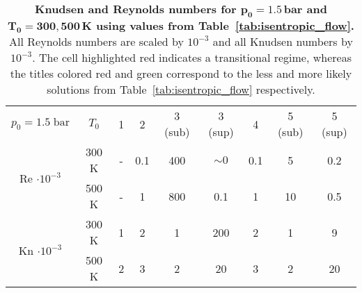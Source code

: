 \begin{table}[H]
    \centering
    \renewcommand{\arraystretch}{1.2}
    \begin{tabular}{|c|c|c|c|c|c|c|c|c|}
    \hline
    \multirow{2}{*}{\small $p_0 = 1.5\;\text{bar}$} 
        & \multirow{2}{*}{$T_0$} 
        & \multirow{2}{*}{1} 
        & \multirow{2}{*}{2} 
        & \multirow{2}{*}{\color{greenColor} 3 (sub)} 
        & \multirow{2}{*}{\color{redColor} 3 (sup)} 
        & \multirow{2}{*}{4} 
        & \multirow{2}{*}{\color{redColor} 5 (sub)} 
        & \multirow{2}{*}{\color{greenColor} 5 (sup)} \\
    & & & & & & & & \\ \hline

    \multirow{2}{*}{Re $\cdot10^{-3}$} 
      & 300 K 
          & - 
          & 0.1 
          & 400 
          & $\sim 0$ 
          & 0.1 
          & 5 
          & 0.2 \\ \cline{2-9}
      & 500 K 
          & - 
          & 1 
          & 800 
          & 0.1 
          & 1 
          & 10 
          & 0.5 \\ \hline

    \multirow{2}{*}{Kn $\cdot10^{-3}$} 
      & 300 K 
          & 1 
          & 2 
          & 1 
          & \cellcolor[HTML]{FFADA8}200 
          & 2 
          & 1 
          & 9 \\ \cline{2-9}
      & 500 K 
          & 2 
          & 3 
          & 2 
          & 20 
          & 3 
          & 2 
          & 20 \\ \hline
    \end{tabular}
    \caption[Knudsen and Reynolds numbers for $p_0 = 1.5\,\mathrm{bar}$ and $T_0 = 300, 600\,\mathrm{K}$ using values from table~\ref{tab:isentropic_flow}.]{
        \textbf{\textbf{Knudsen and Reynolds numbers for $\mathbf{p_0 = 1.5\,\text{bar}}$ and $\mathbf{T_0 = 300, 500\,\text{K}}$ using values from Table~\ref{tab:isentropic_flow}.}}
        All Reynolds numbers are scaled by $10^{-3}$ and all Knudsen numbers by $10^{-3}$.
        The cell highlighted red indicates a transitional regime, whereas the titles colored red and green correspond to the less and more likely solutions from Table~\ref{tab:isentropic_flow} respectively.
    }
    \label{tab:test-knudsen-reynolds-isentropic}
\end{table}
